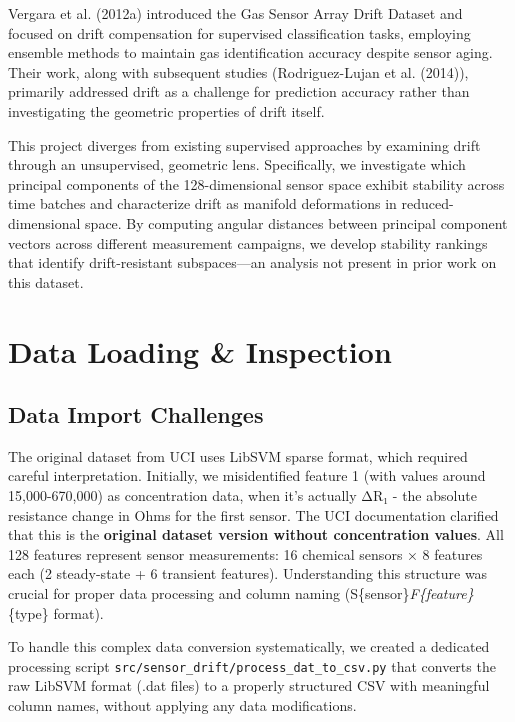 \documentclass[
  letterpaper,
  DIV=11,
  numbers=noendperiod]{scrartcl}
\begin{document}
Vergara et al. (2012a) introduced the Gas Sensor Array Drift Dataset and
focused on drift compensation for supervised classification tasks,
employing ensemble methods to maintain gas identification accuracy
despite sensor aging. Their work, along with subsequent studies
(Rodriguez-Lujan et al. (2014)), primarily addressed drift as a
challenge for prediction accuracy rather than investigating the
geometric properties of drift itself.

This project diverges from existing supervised approaches by examining
drift through an unsupervised, geometric lens. Specifically, we
investigate which principal components of the 128-dimensional sensor
space exhibit stability across time batches and characterize drift as
manifold deformations in reduced-dimensional space. By computing angular
distances between principal component vectors across different
measurement campaigns, we develop stability rankings that identify
drift-resistant subspaces---an analysis not present in prior work on
this dataset.

\section{Data Loading \& Inspection}\label{data-loading-inspection}

\subsection{Data Import Challenges}\label{data-import-challenges}

The original dataset from UCI uses LibSVM sparse format, which required
careful interpretation. Initially, we misidentified feature 1 (with
values around 15,000-670,000) as concentration data, when it's actually
ΔR₁ - the absolute resistance change in Ohms for the first sensor. The
UCI documentation clarified that this is the \textbf{original dataset
version without concentration values}. All 128 features represent sensor
measurements: 16 chemical sensors × 8 features each (2 steady-state + 6
transient features). Understanding this structure was crucial for proper
data processing and column naming
(S\{sensor\}\emph{F\{feature\}}\{type\} format).

To handle this complex data conversion systematically, we created a
dedicated processing script
\texttt{src/sensor\_drift/process\_dat\_to\_csv.py} that converts the
raw LibSVM format (.dat files) to a properly structured CSV with
meaningful column names, without applying any data modifications.
\end{document}
